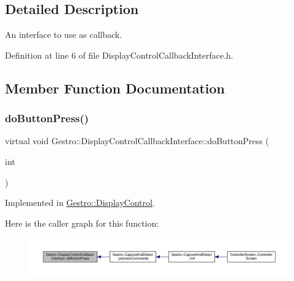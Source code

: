 \subsection{Detailed Description}
An interface to use as callback. 

Definition at line 6 of file Display\+Control\+Callback\+Interface.\+h.



\subsection{Member Function Documentation}
\mbox{\label{class_gestro_1_1_display_control_callback_interface_ab661600cad2743fd41253fb9cabbee51}} 
\subsubsection{\texorpdfstring{do\+Button\+Press()}{doButtonPress()}}
{\footnotesize\ttfamily virtual void Gestro\+::\+Display\+Control\+Callback\+Interface\+::do\+Button\+Press (\begin{DoxyParamCaption}\item[{int}]{ }\end{DoxyParamCaption})\hspace{0.3cm}{\ttfamily [pure virtual]}}



Implemented in \hyperlink{class_gestro_1_1_display_control_a5f45c36e699afa1d56b2af78e5125aca}{Gestro\+::\+Display\+Control}.

Here is the caller graph for this function\+:
\nopagebreak
\begin{figure}[H]
\begin{center}
\leavevmode
\includegraphics[width=350pt]{class_gestro_1_1_display_control_callback_interface_ab661600cad2743fd41253fb9cabbee51_icgraph}
\end{center}
\end{figure}
\mbox{\label{class_gestro_1_1_display_control_callback_interface_af26f63171de9622c5723363732f590c8}} 
